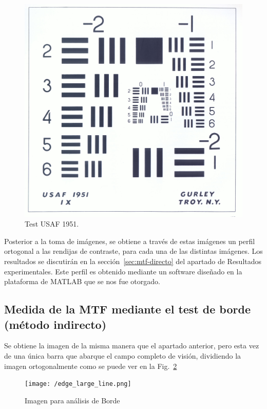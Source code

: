 \documentclass{./packages/optica-article}
\begin{document}
\begin{figure}[h]
	\centering
	\includegraphics[scale=0.08]{testusaf1951}
	\caption{Test USAF 1951.}\label{fig:usaf1951}
\end{figure}

Posterior a la toma de imágenes, se obtiene a través de estas imágenes un perfil ortogonal a las rendijas de contraste, para cada una de las distintas imágenes. Los resultados se discutirán en la sección~\ref{sec:mtf-directo} del apartado de Resultados experimentales. Este perfil es obtenido mediante un software diseñado en la plataforma de MATLAB que se nos fue otorgado.


\subsection{Medida de la MTF mediante el test de borde (método indirecto)}\label{sec:description:indirecto}

Se obtiene la imagen de la misma manera que el apartado anterior, pero esta vez de una única barra que abarque el campo completo de visión, dividiendo la imagen ortogonalmente como se puede ver en la Fig.~\ref{fig:borde1}

\begin{figure}[h]
	\centering
	\texttt{[image: /edge\_large\_line.png]}
	\caption{Imagen para análisis de Borde}\label{fig:borde1}
\end{figure}
\end{document}

